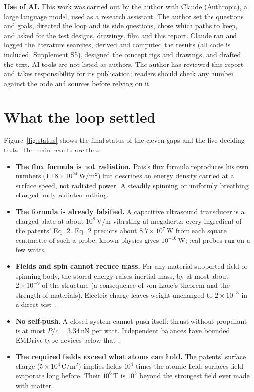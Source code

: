 \documentclass[10.5pt,a4paper]{article}
\newcommand{\e}[1]{\times10^{#1}}
\newcommand{\un}[1]{\,\mathrm{#1}}
\begin{document}
\textbf{Use of AI.} This work was carried out by the author with Claude (Anthropic), a large language model, used as a research assistant. The author set the questions and goals, directed the loop and its side questions, chose which paths to keep, and asked for the test designs, drawings, film and this report. Claude ran and logged the literature searches, derived and computed the results (all code is included, Supplement S5), designed the concept rigs and drawings, and drafted the text. AI tools are not listed as authors. The author has reviewed this report and takes responsibility for its publication; readers should check any number against the code and sources before relying on it.

\section{What the loop settled}
Figure~\ref{fig:status} shows the final status of the eleven gaps and the five deciding tests. The main results are these.
\begin{itemize}
\item \textbf{The flux formula is not radiation.} Pais's flux formula reproduces his own numbers ($1.18\e{24}\un{W/m^2}$) but describes an energy density carried at a surface speed, not radiated power. A steadily spinning or uniformly breathing charged body radiates nothing.
\item \textbf{The formula is already falsified.} A capacitive ultrasound transducer is a charged plate at about $10^8\un{V/m}$ vibrating at megahertz: every ingredient of the patents' Eq.~2. Eq.~2 predicts about $8.7\e7\un{W}$ from each square centimetre of such a probe; known physics gives $10^{-16}\un{W}$; real probes run on a few watts.
\item \textbf{Fields and spin cannot reduce mass.} For any material-supported field or spinning body, the stored energy raises inertial mass, by at most about $2\e{-9}$ of the structure (a consequence of von Laue's theorem and the strength of materials). Electric charge leaves weight unchanged to $2\e{-3}$ in a direct test \cite{hathaway}.
\item \textbf{No self-push.} A closed system cannot push itself: thrust without propellant is at most $P/c = 3.34\un{nN}$ per watt. Independent balances have bounded EMDrive-type devices below that \cite{tajmar21}.
\item \textbf{The required fields exceed what atoms can hold.} The patents' surface charge ($5\e4\un{C/m^2}$) implies fields $10^4$ times the atomic field; surfaces field-evaporate long before. Their $10^6\un{T}$ is $10^3$ beyond the strongest field ever made with matter.
\end{itemize}
\end{document}
